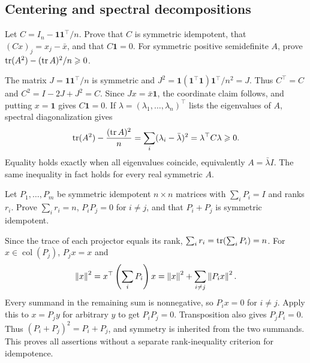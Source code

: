 \subsection*{Centering and spectral decompositions}
\begin{problem}\label{ex:12:centering}
Let $C=I_n-\mathbf1\mathbf1^\top/n$. Prove that $C$ is symmetric
idempotent, that $(Cx)_j=x_j-\bar x$, and that $C\mathbf1=0$.
For symmetric positive semidefinite $A$, prove
$\operatorname{tr}(A^2)-(\operatorname{tr} A)^2/n\geqslant0$.
\end{problem}
\begin{solution}
The matrix $J=\mathbf1\mathbf1^\top/n$ is symmetric and
$J^2=\mathbf1(\mathbf1^\top\mathbf1)\mathbf1^\top/n^2=J$.
Thus $C^\top=C$ and $C^2=I-2J+J^2=C$.
Since $Jx=\bar x\mathbf1$, the coordinate claim follows, and putting
$x=\mathbf1$ gives $C\mathbf1=0$.
If $\lambda=(\lambda_1,\ldots,\lambda_n)^\top$ lists the eigenvalues
of $A$, spectral diagonalization gives
\[
\operatorname{tr}(A^2)-\frac{(\operatorname{tr} A)^2}{n}
=\sum_i(\lambda_i-\bar\lambda)^2
=\lambda^\top C\lambda\geqslant0.
\]
Equality holds exactly when all eigenvalues coincide, equivalently
$A=\bar\lambda I$. The same inequality in fact holds for every real
symmetric $A$.
\end{solution}

\begin{problem}
Let $P_1,\ldots,P_m$ be symmetric idempotent $n\times n$ matrices with
$\sum_iP_i=I$ and ranks $r_i$. Prove $\sum_i r_i=n$,
$P_iP_j=0$ for $i\ne j$, and that $P_i+P_j$ is symmetric idempotent.
\end{problem}
\begin{solution}
Since the trace of each projector equals its rank,
$\sum_i r_i=\operatorname{tr}(\sum_iP_i)=n$.
For $x\in\operatorname{col}(P_j)$, $P_jx=x$ and
\[
\left\lVert x\right\rVert^2=x^\top\left(\sum_iP_i\right)x
=\left\lVert x\right\rVert^2+\sum_{i\ne j}\left\lVert P_ix\right\rVert^2.
\]
Every summand in the remaining sum is nonnegative, so $P_ix=0$ for
$i\ne j$. Apply this to $x=P_jy$ for arbitrary $y$ to get $P_iP_j=0$.
Transposition also gives $P_jP_i=0$.
Thus $(P_i+P_j)^2=P_i+P_j$, and symmetry is inherited from the two
summands. This proves all assertions without a separate rank-inequality
criterion for idempotence.
\end{solution}

